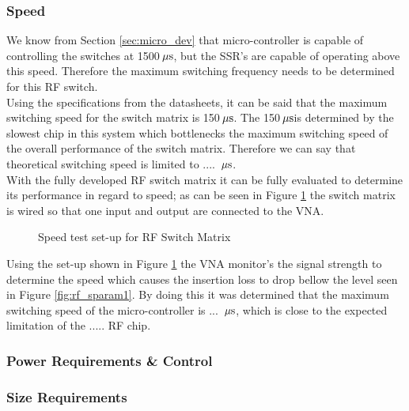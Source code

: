 \documentclass[12pt,openany,a4paper]{book}
\newcommand{\us}	{\ensuremath{\rm\,\mu s}}
\begin{document}
\subsubsection{Speed}
We know from Section \ref{sec:micro_dev} that micro-controller is capable of controlling the switches at 1500\us , but the SSR's are capable of operating above this speed. Therefore the maximum switching frequency needs to be determined for this RF switch. \\
Using the specifications from the datasheets, it can be said that the maximum switching speed for the switch matrix is 150\us. The 150\us is determined by the slowest chip in this system which bottlenecks the maximum switching speed of the overall performance of the switch matrix. Therefore we can say that theoretical switching speed is limited to .... \us . \\[0.3cm]
With the fully developed RF switch matrix it can be fully evaluated to determine its performance in regard to speed; as can be seen in Figure \ref{fig:speedtest} the switch matrix is wired so that one input and output are connected to the VNA.
\begin{figure}[H]
	\centering
	\caption{Speed test set-up for RF Switch Matrix}
	\label{fig:speedtest}
\end{figure} 
Using the set-up shown in Figure \ref{fig:speedtest} the VNA monitor's the signal strength to determine the speed which causes the insertion loss to drop bellow the level seen in Figure \ref{fig:rf_sparam1}. By doing this it was determined that the maximum switching speed of the micro-controller is ... \us , which is close to the expected limitation of the ..... RF chip.

\subsubsection{Power Requirements \& Control}

\subsubsection{Size Requirements}

\end{document}
